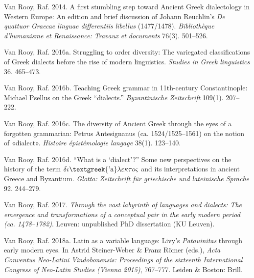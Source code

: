 \begin{styleStandard}
Van Rooy, Raf. 2014. A first stumbling step toward Ancient Greek dialectology in Western Europe: An edition and brief discussion of Johann Reuchlin’s \textit{De quattuor Graecae linguae differentiis libellus} (1477/1478). \textit{Bibliothèque d’humanisme et Renaissance: Travaux et documents} 76(3). 501–526.
\end{styleStandard}

\begin{styleStandard}
Van Rooy, Raf. 2016a. Struggling to order diversity: The variegated classifications of Greek dialects before the rise of modern linguistics. \textit{Studies in Greek linguistics} 36. 465–473.
\end{styleStandard}

\begin{styleStandard}
Van Rooy, Raf. 2016b. Teaching Greek grammar in 11th-century Constantinople: Michael Psellus on the Greek “dialects.” \textit{Byzantinische Zeitschrift} 109(1). 207–222.
\end{styleStandard}

\begin{styleStandard}
Van Rooy, Raf. 2016c. The diversity of Ancient Greek through the eyes of a forgotten grammarian: Petrus Antesignanus (ca. 1524/1525–1561) on the notion of «dialect». \textit{Histoire épistémologie langage} 38(1). 123–140.
\end{styleStandard}

\begin{styleStandard}
Van Rooy, Raf. 2016d. “What is a ‘dialect’?” Some new perspectives on the history of the term $\delta \iota \text{\textgreek{'a}}\lambda \varepsilon \kappa \tau o\varsigma $ and its interpretations in ancient Greece and Byzantium. \textit{Glotta: Zeitschrift für griechische und lateinische Sprache} 92. 244–279.
\end{styleStandard}

\begin{styleStandard}
Van Rooy, Raf. 2017. \textit{Through the vast labyrinth of languages and dialects: The emergence and transformations of a conceptual pair in the early modern period (ca. 1478–1782)}. Leuven: unpublished PhD dissertation (KU Leuven).
\end{styleStandard}

\begin{styleStandard}
Van Rooy, Raf. 2018a. Latin as a variable language: Livy’s \textit{Patauinitas} through early modern eyes. In Astrid Steiner-Weber \& Franz Römer (eds.), \textit{Acta Conventus Neo-Latini Vindobonensis: Proceedings of the sixteenth International Congress of Neo-Latin Studies (Vienna 2015)}, 767–777. Leiden \& Boston: Brill.
\end{styleStandard}

